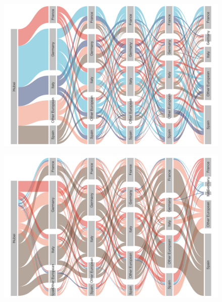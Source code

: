 \documentclass[12pt,]{article}
\begin{document}
\begin{figure}[ht]
    \centering
    \includegraphics[width=\textwidth]{201014_europe2_figtraj04.png}
    \caption{}
    \label{fig:first_dest}
\end{figure}

\begin{figure}[ht]
    \centering
    \includegraphics[width=\textwidth]{201014_europe2_figtraj05.png}
    \caption{}
    \label{fig:first_src}
\end{figure}
\end{document}
